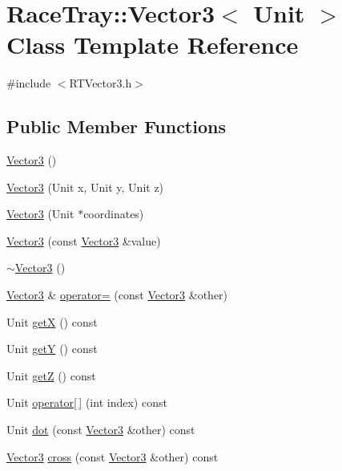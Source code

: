 \hypertarget{class_race_tray_1_1_vector3}{\section{Race\-Tray\-:\-:Vector3$<$ Unit $>$ Class Template Reference}
\label{class_race_tray_1_1_vector3}
}


{\ttfamily \#include $<$R\-T\-Vector3.\-h$>$}

\subsection*{Public Member Functions}
\begin{DoxyCompactItemize}
\item 
\hyperlink{group___math_ga0f49191f7e001e7f7ae1cb49522118b4}{Vector3} ()
\item 
\hyperlink{group___math_gaaa5ebab83f6d1f282df85ece8153311d}{Vector3} (Unit x, Unit y, Unit z)
\item 
\hyperlink{group___math_ga1467854ce0d4ef24f84fecf84446910b}{Vector3} (Unit $\ast$coordinates)
\item 
\hyperlink{group___math_ga636420f8171f95d953e80b9752ca98e8}{Vector3} (const \hyperlink{class_race_tray_1_1_vector3}{Vector3} \&value)
\item 
\hyperlink{group___math_ga5545e13e2e2861ece8f14b12a6a8101f}{$\sim$\-Vector3} ()
\item 
\hyperlink{class_race_tray_1_1_vector3}{Vector3} \& \hyperlink{group___math_gadcef1abbe010682b06779beab2fddc9e}{operator=} (const \hyperlink{class_race_tray_1_1_vector3}{Vector3} \&other)
\item 
Unit \hyperlink{group___math_gad352703f15280f9a3e92ab30f8f0a559}{get\-X} () const 
\item 
Unit \hyperlink{group___math_ga958d217bc40bbecc3f7710f7d21d69e2}{get\-Y} () const 
\item 
Unit \hyperlink{group___math_ga78a16de98839cff6799b841cd5dce3a5}{get\-Z} () const 
\item 
Unit \hyperlink{group___math_gac176f26759f013157ae339e037abcbbd}{operator\mbox{[}$\,$\mbox{]}} (int index) const 
\item 
Unit \hyperlink{group___math_ga6a55bfca19953a2b43b30796e4ce3f67}{dot} (const \hyperlink{class_race_tray_1_1_vector3}{Vector3} \&other) const 
\item 
\hyperlink{class_race_tray_1_1_vector3}{Vector3} \hyperlink{group___math_ga3bad6b5bd57c5e674c6cb47e6eb75246}{cross} (const \hyperlink{class_race_tray_1_1_vector3}{Vector3} \&other) const 

\end{DoxyCompactItemize}

